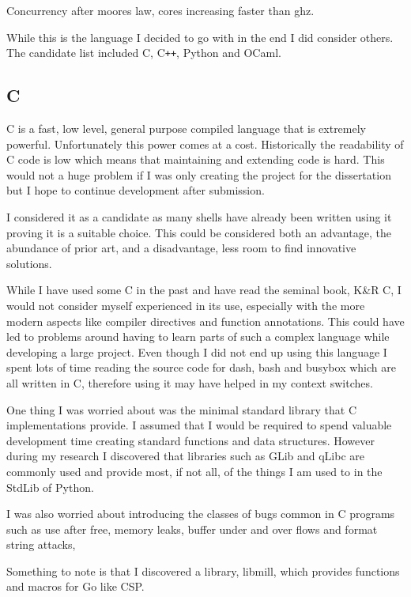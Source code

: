 Concurrency after moores law, cores increasing faster than ghz.

While this is the language I decided to go with in the end I did consider others.
The candidate list included C, C\verb!++!, Python and OCaml.

\subsection{C}
C is a fast, low level, general purpose compiled language that is extremely powerful.
Unfortunately this power comes at a cost.
Historically the readability of C code is low which means that maintaining and extending code is hard.
This would not a huge problem if I was only creating the project for the dissertation but I hope to continue development after submission.

I considered it as a candidate as many shells have already been written using it proving it is a suitable choice.
This could be considered both an advantage, the abundance of prior art, and a disadvantage, less room to find innovative solutions.

While I have used some C in the past and have read the seminal book, K\&R C, I would not consider myself experienced in its use, especially with the more modern aspects like compiler directives and function annotations.
This could have led to problems around having to learn parts of such a complex language while developing a large project.
Even though I did not end up using this language I spent lots of time reading the source code for dash, bash and busybox which are all written in C, therefore using it  may have helped in my context switches. 

One thing I was worried about was the minimal standard library that C implementations provide.
I assumed that I would be required to spend valuable development time creating standard functions and data structures.
However during my research I discovered that libraries such as GLib and qLibc are commonly used and provide most, if not all, of the things I am used to in the StdLib of Python.

I was also worried about introducing the classes of bugs common in C programs such as use after free, memory leaks, buffer under and over flows and format string attacks,


Something to note is that I discovered a library, libmill\cite{LIBMILL}, which provides functions and macros for Go like CSP.



